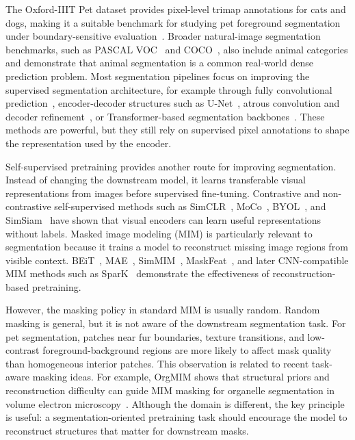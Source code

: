 \documentclass[11pt]{article}
\begin{document}
The Oxford-IIIT Pet dataset provides pixel-level trimap annotations for cats and dogs, making it a suitable benchmark for studying pet foreground segmentation under boundary-sensitive evaluation~\cite{parkhi2012cats}. Broader natural-image segmentation benchmarks, such as PASCAL VOC~\cite{everingham2010pascal} and COCO~\cite{lin2014microsoft}, also include animal categories and demonstrate that animal segmentation is a common real-world dense prediction problem. Most segmentation pipelines focus on improving the supervised segmentation architecture, for example through fully convolutional prediction~\cite{long2015fully}, encoder-decoder structures such as U-Net~\cite{ronneberger2015unet}, atrous convolution and decoder refinement~\cite{chen2018encoder}, or Transformer-based segmentation backbones~\cite{xie2021segformer}. These methods are powerful, but they still rely on supervised pixel annotations to shape the representation used by the encoder.

Self-supervised pretraining provides another route for improving segmentation. Instead of changing the downstream model, it learns transferable visual representations from images before supervised fine-tuning. Contrastive and non-contrastive self-supervised methods such as SimCLR~\cite{chen2020simclr}, MoCo~\cite{he2020moco}, BYOL~\cite{grill2020byol}, and SimSiam~\cite{chen2021simsiam} have shown that visual encoders can learn useful representations without labels. Masked image modeling (MIM) is particularly relevant to segmentation because it trains a model to reconstruct missing image regions from visible context. BEiT~\cite{bao2022beit}, MAE~\cite{he2022masked}, SimMIM~\cite{xie2022simmim}, MaskFeat~\cite{wei2022masked}, and later CNN-compatible MIM methods such as SparK~\cite{tian2023spark} demonstrate the effectiveness of reconstruction-based pretraining.

However, the masking policy in standard MIM is usually random. Random masking is general, but it is not aware of the downstream segmentation task. For pet segmentation, patches near fur boundaries, texture transitions, and low-contrast foreground-background regions are more likely to affect mask quality than homogeneous interior patches. This observation is related to recent task-aware masking ideas. For example, OrgMIM shows that structural priors and reconstruction difficulty can guide MIM masking for organelle segmentation in volume electron microscopy~\cite{zhang2026orgmim}. Although the domain is different, the key principle is useful: a segmentation-oriented pretraining task should encourage the model to reconstruct structures that matter for downstream masks.
\end{document}
